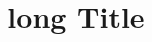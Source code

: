 \def\authors{Jules PESIN}
\def\longTitle{long Title}
\def\shortTitle{short Title}

\title[\shortTitle]{\longTitle}
